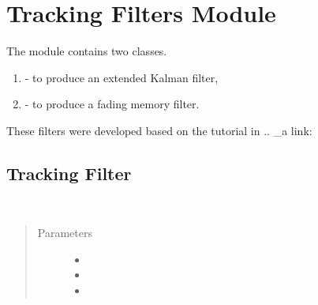 \documentclass[letterpaper,10pt,english]{sphinxmanual}
\begin{document}
\chapter{Tracking Filters Module}
\label{\detokenize{trackingfilters::doc}}\label{\detokenize{trackingfilters:tracking-filters-module}}
The module contains two classes.
\begin{enumerate}
\item {} 
 - to produce an extended Kalman filter,

\item {} 
 - to produce a fading memory filter.

\end{enumerate}

These filters were developed based on the tutorial in
.. \_a link: 
\label{\detokenize{trackingfilters:module-tracking_filters}}

\section{Tracking Filter}
\label{\detokenize{trackingfilters:tracking-filter}}

\begin{fulllineitems}
\label{\detokenize{trackingfilters:tracking_filters.TrackingFilter}}~\begin{quote}\begin{description}
\item[{Parameters}] \leavevmode\begin{itemize}
\item {} 
 \textendash{} 

\item {} 
 \textendash{} 

\item {} 
 \textendash{} 

\end{itemize}

\end{description}\end{quote}

\end{fulllineitems}
\end{document}
